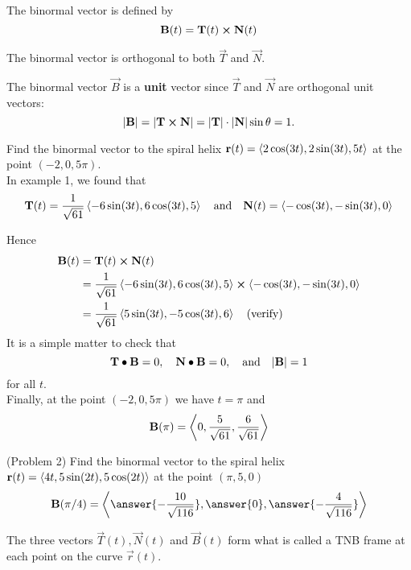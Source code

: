 \documentclass[handout]{ximera}
\begin{document}
\begin{definition}
The binormal vector is defined by
\[
\mathbf B(t) = \mathbf T(t) \boldsymbol\times \mathbf N(t)
\]
\end{definition}

\begin{remark}
The binormal vector is orthogonal to both $\vec T$ and $\vec N$. 
\end{remark}

\begin{remark}
The binormal vector $\vec B$ is a \textbf{unit} vector since $\vec T$ and $\vec N$ are orthogonal unit vectors:
\[
|\mathbf B| = |\mathbf T \boldsymbol\times \mathbf N| = |\mathbf T| \cdot |\mathbf N| \sin \theta = 1.
\]
\end{remark}

\begin{example}[Example 2]
Find the binormal vector to the spiral helix $\mathbf r(t) =  \left\langle 2\cos(3t), 2\sin(3t), 5t\right\rangle$ at the point $(-2, 0, 5\pi)$.\\
In example 1, we found that
\[
\mathbf T(t) = \frac{1}{\sqrt{61}} \left\langle -6 \sin(3t), 6\cos(3t), 5\right\rangle \quad \text{and} \quad \mathbf N(t) = \left\langle -\cos(3t), -\sin(3t), 0\right\rangle
\]

Hence
\begin{align*}
\mathbf B(t) &= \mathbf T(t) \boldsymbol\times \mathbf N(t)\\
          &= \frac{1}{\sqrt{61}} \left\langle -6 \sin(3t), 6\cos(3t), 5\right\rangle \boldsymbol\times \left\langle -\cos(3t), -\sin(3t), 0\right\rangle\\
          &= \frac{1}{\sqrt{61}} \left\langle 5 \sin(3t), -5 \cos(3t), 6\right\rangle \quad \text{(verify)}
\end{align*}
It is a simple matter to check that 
\[
\mathbf T \bullet \mathbf B = 0, \quad \mathbf N \bullet \mathbf B = 0, \quad \text{and} \quad |\mathbf B| = 1
\]
for all $t$.\\
Finally, at the point $(-2, 0, 5\pi)$ we have $t = \pi$ and
\[
\mathbf B(\pi) = \left\langle 0, \frac{5}{\sqrt {61}}, \frac{6}{\sqrt{61}}\right\rangle
\]
\end{example}

\begin{problem}(Problem 2)
Find the binormal vector to the spiral helix $\mathbf r(t) = \left\langle 4t, 5 \sin(2t),5\cos(2t)\right\rangle$ at the point $(\pi, 5, 0)$\\
\[
\vec B(\pi/4) = \vector{\answer{-\frac{10}{\sqrt{116}}}, \answer{0}, \answer{-\frac{4}{\sqrt{116}}}}
\]


\end{problem}


The three vectors $\vec T(t), \vec N(t)$ and $\vec B(t)$ form what is called a TNB frame at each point on the curve $\vec r(t)$.
\end{document}
